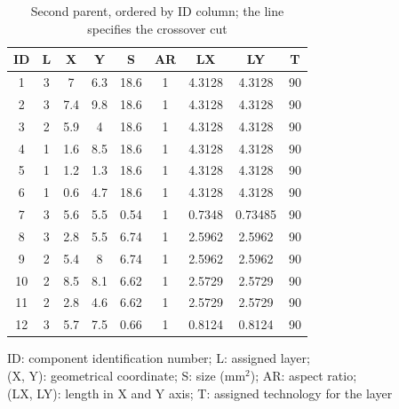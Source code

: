 \begin{table}[pt]
\caption{Second parent, ordered by ID column; the line specifies the crossover cut}
\begin{center}
\begin{scriptsize}
\begin{tabular}{|c|c|c|c|c|c|c|c|c|}
\hline ID & L & X & Y & S & AR & LX & LY & T\\
\hline 1 & 3 & 7 & 6.3 & 18.6 & 1 & 4.3128 & 4.3128 & 90\\
2 & 3 & 7.4 & 9.8 & 18.6 & 1 & 4.3128 & 4.3128 & 90\\
3 & 2 & 5.9 & 4 & 18.6 & 1 & 4.3128 & 4.3128 & 90\\
4 & 1 & 1.6 & 8.5 & 18.6 & 1 & 4.3128 & 4.3128 & 90\\
5 & 1 & 1.2 & 1.3 & 18.6 & 1 & 4.3128 & 4.3128 & 90\\
6 & 1 & 0.6 & 4.7 & 18.6 & 1 & 4.3128 & 4.3128 & 90\\
7 & 3 & 5.6 & 5.5 & 0.54 & 1 & 0.7348 & 0.73485 & 90\\
\hline
\hline
8 & 3 & 2.8 & 5.5 & 6.74 & 1 & 2.5962 & 2.5962 & 90\\
9 & 2 & 5.4 & 8 & 6.74 & 1 & 2.5962 & 2.5962 & 90\\
10 & 2 & 8.5 & 8.1 & 6.62 & 1 & 2.5729 & 2.5729 & 90\\
11 & 2 & 2.8 & 4.6 & 6.62 & 1 & 2.5729 & 2.5729 & 90\\
12 & 3 & 5.7 & 7.5 & 0.66 & 1 & 0.8124 & 0.8124 & 90\\
\hline
\end{tabular}
\end{scriptsize}
\end{center}
\begin{center}
\begin{scriptsize}
ID: component identification number; L: assigned layer;\\
(X, Y): geometrical coordinate; S: size (mm$^2$); AR: aspect ratio;\\
(LX, LY): length in X and Y axis; T: assigned technology for the layer
\end{scriptsize}
\end{center}
\label{tab:secondparentIDrow}
\end{table}

